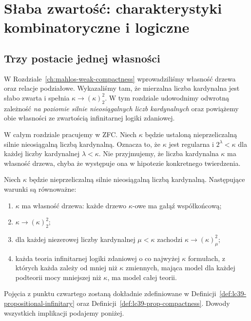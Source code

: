 \chapter{Słaba zwartość: charakterystyki kombinatoryczne i logiczne}
\label{ch:weak-compactness-characterizations}

\section{Trzy postacie jednej własności}

W Rozdziale~\ref{ch:mahlos-weak-compactness} wprowadziliśmy
własność drzewa oraz relacje podziałowe. Wykazaliśmy tam,
że mierzalna liczba kardynalna jest słabo zwarta
i spełnia $\kappa\longrightarrow(\kappa)^2_2$.
W tym rozdziale udowodnimy odwrotną zależność
\emph{na poziomie silnie nieosiągalnych liczb kardynalnych}
oraz powiążemy obie własności ze zwartością
infinitarnej logiki zdaniowej.

W całym rozdziale pracujemy w ZFC.
Niech $\kappa$ będzie ustaloną nieprzeliczalną
silnie nieosiągalną liczbą kardynalną.
Oznacza to, że $\kappa$ jest regularna
i $2^\lambda<\kappa$ dla każdej liczby
kardynalnej $\lambda<\kappa$.
Nie przyjmujemy, że liczba kardynalna
$\kappa$ ma własność drzewa, chyba że
występuje ona w hipotezie konkretnego twierdzenia.

\begin{twierdzenie}
\label{thm:lc39-main-equivalence}
Niech $\kappa$ będzie nieprzeliczalną
silnie nieosiągalną liczbą kardynalną.
Następujące warunki są równoważne:
\begin{enumerate}
\item $\kappa$ ma własność drzewa:
każde drzewo $\kappa$-owe ma gałąź współkońcową;
\item $\kappa\longrightarrow(\kappa)^2_2$;
\item dla każdej niezerowej liczby kardynalnej
$\mu<\kappa$ zachodzi
$\kappa\longrightarrow(\kappa)^2_\mu$;
\item każda teoria infinitarnej logiki
zdaniowej o co najwyżej $\kappa$ formułach,
z których każda zależy od mniej niż
$\kappa$ zmiennych, mająca model dla
każdej podteorii mocy mniejszej niż
$\kappa$, ma model całej teorii.
\end{enumerate}
Pojęcia z punktu czwartego zostaną dokładnie
zdefiniowane w
Definicji~\ref{def:lc39-propositional-infinitary}
oraz Definicji~\ref{def:lc39-prop-compactness}.
Dowody wszystkich implikacji podajemy poniżej.
\end{twierdzenie}


